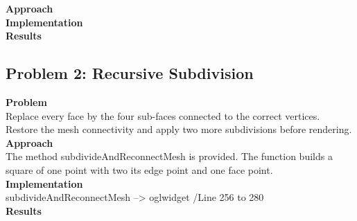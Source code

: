 \documentclass[12pt,a4paper]{scrartcl}
\begin{document}
\textbf{Approach}\\
\textbf{Implementation}\\
\textbf{Results}\\
\subsection{Problem 2: Recursive Subdivision}

\large
\textbf{Problem}\\
Replace every face by the four sub-faces connected to the correct vertices. Restore the mesh
connectivity and apply two more subdivisions before rendering. \\
\textbf{Approach}\\
The method subdivideAndReconnectMesh is provided. The function builds a square of one point with two its edge point and one face point.\\
\textbf{Implementation}\\
subdivideAndReconnectMesh --> oglwidget /Line 256 to 280\\
\textbf{Results}\\
\end{document}
